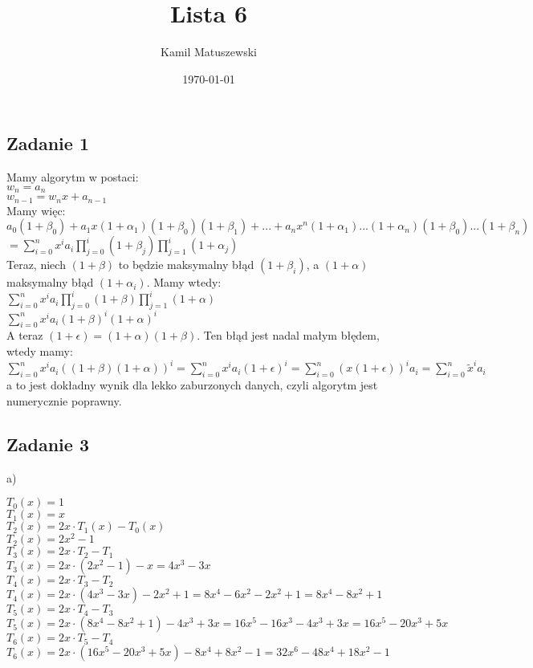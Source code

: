 \documentclass[a4paper]{article}
\title{Lista 6}
\author{Kamil Matuszewski}
\date{\today}
\begin{document}
\maketitle
\setlength{\parindent}{0.5ex}
\setlength{\parskip}{1.5ex}

\subsection*{Zadanie 1}
Mamy algorytm w postaci:\\
$w_n=a_n$\\
$w_{n-1}=w_n x + a_{n-1}$\\
Mamy więc:\\
$a_0(1+\beta_0)+a_1 x(1+\alpha_1)(1+\beta_0)(1+\beta_1)+...+a_n x^n (1+\alpha_1)...(1+\alpha_n)(1+\beta_0)...(1+\beta_n)$\\
$=\sum\limits_{i=0}^n x^i a_i \prod\limits_{j=0}^i(1+\beta_j) \prod\limits_{j=1}^i(1+\alpha_j) $\\
Teraz, niech $(1+\beta)$ to będzie maksymalny błąd $(1+\beta_i)$, a $(1+\alpha)$ maksymalny błąd $(1+\alpha_i)$. Mamy wtedy:\\
$\sum\limits_{i=0}^n x^i a_i \prod\limits_{j=0}^i(1+\beta) \prod\limits_{j=1}^i(1+\alpha) $\\
$\sum\limits_{i=0}^n x^i a_i (1+\beta)^i (1+\alpha)^i $\\
A teraz $(1+\epsilon)=(1+\alpha)(1+\beta)$. Ten błąd jest nadal małym błędem, wtedy mamy:\\
\Large$\sum\limits_{i=0}^n x^i a_i ((1+\beta)(1+\alpha))^i = \sum\limits_{i=0}^n x^i a_i (1+\epsilon)^i = \sum\limits_{i=0}^n (x(1+\epsilon))^i a_i =\sum\limits_{i=0}^n \tilde{x}^i a_i $\\ \normalsize
a to jest dokładny wynik dla lekko zaburzonych danych, czyli algorytm jest numerycznie poprawny.

\clearpage
\subsection*{Zadanie 3}
\Large a) \normalsize

$T_{0}(x)=1$\\
$T_{1}(x)=x$\\
$T_{2}(x)=2x\cdot T_{1}(x) - T_{0}(x)$\\
$T_{2}(x)=2x^2 - 1$\\
$T_{3}(x)=2x\cdot T_{2}  - T_{1}$\\
$T_{3}(x)=2x\cdot (2x^2 - 1) - x = 4x^3-3x$\\
$T_{4}(x)=2x\cdot T_{3}  - T_{2}$\\
$T_{4}(x)=2x\cdot (4x^3-3x)  - 2x^2 + 1= 8x^4-6x^2-2x^2+1=8x^4-8x^2+1$\\
$T_{5}(x)=2x\cdot T_{4}  - T_{3}$\\
$T_{5}(x)=2x\cdot (8x^4-8x^2+1)  - 4x^3+3x = 16x^5-16x^3-4x^3+3x=16x^5-20x^3+5x$\\
$T_{6}(x)=2x\cdot T_{5}  - T_{4}$\\
$T_{6}(x)=2x\cdot (16x^5-20x^3+5x)  - 8x^4+8x^2-1 = 32x^6-48x^4+18x^2-1$
\end{document}
